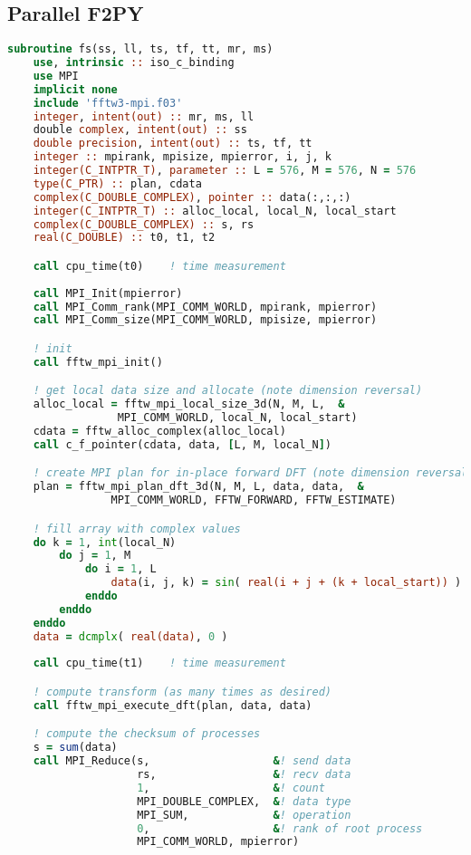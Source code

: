 \subsection{Parallel F2PY}
\begin{lstlisting}[language=Fortran, caption={Parallel F2PY implementation of the FFT test case - F90 module code.}]
subroutine fs(ss, ll, ts, tf, tt, mr, ms)
    use, intrinsic :: iso_c_binding
    use MPI
    implicit none
    include 'fftw3-mpi.f03'
    integer, intent(out) :: mr, ms, ll
    double complex, intent(out) :: ss
    double precision, intent(out) :: ts, tf, tt
    integer :: mpirank, mpisize, mpierror, i, j, k
    integer(C_INTPTR_T), parameter :: L = 576, M = 576, N = 576
    type(C_PTR) :: plan, cdata
    complex(C_DOUBLE_COMPLEX), pointer :: data(:,:,:)
    integer(C_INTPTR_T) :: alloc_local, local_N, local_start
    complex(C_DOUBLE_COMPLEX) :: s, rs
    real(C_DOUBLE) :: t0, t1, t2

    call cpu_time(t0)    ! time measurement
    
    call MPI_Init(mpierror)
    call MPI_Comm_rank(MPI_COMM_WORLD, mpirank, mpierror)
    call MPI_Comm_size(MPI_COMM_WORLD, mpisize, mpierror)

    ! init
    call fftw_mpi_init()    

    ! get local data size and allocate (note dimension reversal)
    alloc_local = fftw_mpi_local_size_3d(N, M, L,  &
                 MPI_COMM_WORLD, local_N, local_start)
    cdata = fftw_alloc_complex(alloc_local)
    call c_f_pointer(cdata, data, [L, M, local_N])

    ! create MPI plan for in-place forward DFT (note dimension reversal)
    plan = fftw_mpi_plan_dft_3d(N, M, L, data, data,  &
                MPI_COMM_WORLD, FFTW_FORWARD, FFTW_ESTIMATE)

    ! fill array with complex values
    do k = 1, int(local_N)
        do j = 1, M
            do i = 1, L
                data(i, j, k) = sin( real(i + j + (k + local_start)) )
            enddo
        enddo
    enddo
    data = dcmplx( real(data), 0 )
    
    call cpu_time(t1)    ! time measurement

    ! compute transform (as many times as desired)
    call fftw_mpi_execute_dft(plan, data, data)

    ! compute the checksum of processes
    s = sum(data)
    call MPI_Reduce(s,                   &! send data
                    rs,                  &! recv data
                    1,                   &! count
                    MPI_DOUBLE_COMPLEX,  &! data type
                    MPI_SUM,             &! operation
                    0,                   &! rank of root process
                    MPI_COMM_WORLD, mpierror)
    

\end{lstlisting}
